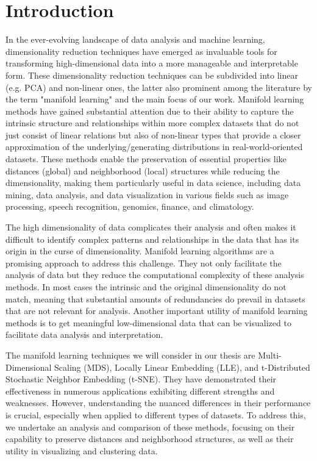 \chapter{Introduction}

In the ever-evolving landscape of data analysis and machine learning, dimensionality reduction techniques have emerged as invaluable tools for transforming high-dimensional data into a more manageable and interpretable form. These dimensionality reduction techniques can be subdivided into linear (e.g. PCA) and non-linear ones, the latter also prominent among the literature by the term "manifold learning" and the main focus of our work. Manifold learning methods have gained substantial attention due to their ability to capture the intrinsic structure and relationships within more complex datasets that do not just consist of linear relations but also of non-linear types that provide a closer approximation of the underlying/generating distributions in real-world-oriented datasets. These methods enable the preservation of essential properties like distances (global) and neighborhood (local) structures while reducing the dimensionality, making them particularly useful in data science, including data mining, data analysis, and data visualization in various fields such as image processing, speech recognition, genomics, finance, and climatology.

The high dimensionality of data complicates their analysis and often makes it difficult to identify complex patterns and relationships in the data that has its origin in the curse of dimensionality.\cite{curse_dim} Manifold learning algorithms are a promising approach to address this challenge. They not only facilitate the analysis of data but they reduce the computational complexity of these analysis methods. In most cases the intrinsic and the original dimensionality do not match, meaning that substantial amounts of redundancies do prevail in datasets that are not relevant for analysis. Another important utility of manifold learning methods is to get meaningful low-dimensional data that can be visualized to facilitate data analysis and interpretation.

The manifold learning techniques we will consider in our thesis are Multi-Dimensional Scaling (MDS), Locally Linear Embedding (LLE), and t-Distributed Stochastic Neighbor Embedding (t-SNE). They have demonstrated their effectiveness in numerous applications exhibiting different strengths and weaknesses. However, understanding the nuanced differences in their performance is crucial, especially when applied to different types of datasets. To address this, we undertake an analysis and comparison of these methods, focusing on their capability to preserve distances and neighborhood structures, as well as their utility in visualizing and clustering data.

